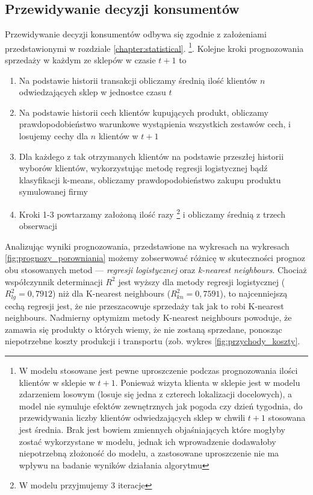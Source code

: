 \documentclass[polish, twoside, 12pt, a4paper]{article}
\theoremstyle{definition}
\theoremstyle{plain}
\theoremstyle{remark}
\begin{document}
\subsection{Przewidywanie decyzji konsumentów}

Przewidywanie decyzji konsumentów odbywa się zgodnie z założeniami przedstawionymi w rozdziale \ref{chapter:statistical}. \footnote{W modelu stosowane jest pewne uproszczenie podczas prognozowania ilości klientów w sklepie w $t+1$. Ponieważ wizyta klienta w sklepie jest w modelu zdarzeniem losowym (losuje się jedna z czterech lokalizacji docelowych), a model nie symuluje efektów zewnętrznych jak pogoda czy dzień tygodnia, do przewidywania liczby klientów odwiedzających sklep w chwili $t+1$ stosowana jest średnia. Brak jest bowiem zmiennych objaśniających które mogłyby zostać wykorzystane w modelu, jednak ich wprowadzenie dodawałoby niepotrzebną złożoność do modelu, a zastosowane uproszczenie nie ma wpływu na badanie wyników działania algorytmu}. Kolejne kroki prognozowania sprzedaży w każdym ze sklepów w czasie $t+1$ to 

\begin{enumerate}
	\item Na podstawie historii transakcji obliczamy średnią ilość klientów $n$ odwiedzających sklep w jednostce czasu $t$
	\item Na podstawie historii cech klientów kupujących produkt, obliczamy prawdopodobieństwo warunkowe wystąpienia wszystkich zestawów cech, i losujemy cechy dla $n$ klientów w $t+1$ 
	\item Dla każdego z tak otrzymanych klientów na podstawie przeszłej historii wyborów klientów, wykorzystując metodę regresji logistycznej bądź klasyfikacji k-means, obliczamy 			prawdopodobieństwo zakupu produktu symulowanej firmy
	\item Kroki 1-3 powtarzamy założoną ilość razy \footnote{W modelu przyjmujemy 3 iteracje} i obliczamy średnią z trzech obserwacji
\end{enumerate} 

Analizując wyniki prognozowania, przedstawione na wykresach na wykresach \ref{fig:prognozy_porowniania} możemy zobserwować różnicę w skuteczności prognoz obu stosowanych metod --- \textit{regresji logistycznej} oraz \textit{k-nearest neighbours}. Chociaż współczynnik determinacji $R^2$ jest wyższy dla metody regresji logistycznej ($R_{lg}^2 = 0,7912$) niż dla K-nearest neighbours ($R_{kn}^2 = 0,7591$), to najcenniejszą cechą regresji jest, że nie przeszacowuje sprzedaży tak jak to robi K-nearest neighbours. Nadmierny optymizm metody K-nearest neighbours powoduje, że zamawia się produkty o których wiemy, że nie zostaną sprzedane, ponosząc niepotrzebne koszty produkcji i transportu (zob. wykres \ref{fig:przychody_koszty}. 
\end{document}
